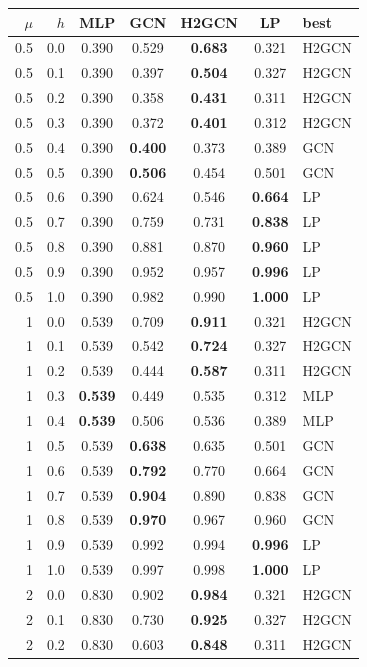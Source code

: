 \begin{tabular}{rrccccl}
\toprule
$\mu$ & $h$ & MLP & GCN & H2GCN & LP & best \\
\midrule
0.5 & 0.0 & 0.390 & 0.529 & \textbf{0.683} & 0.321 & H2GCN \\
0.5 & 0.1 & 0.390 & 0.397 & \textbf{0.504} & 0.327 & H2GCN \\
0.5 & 0.2 & 0.390 & 0.358 & \textbf{0.431} & 0.311 & H2GCN \\
0.5 & 0.3 & 0.390 & 0.372 & \textbf{0.401} & 0.312 & H2GCN \\
0.5 & 0.4 & 0.390 & \textbf{0.400} & 0.373 & 0.389 & GCN \\
0.5 & 0.5 & 0.390 & \textbf{0.506} & 0.454 & 0.501 & GCN \\
0.5 & 0.6 & 0.390 & 0.624 & 0.546 & \textbf{0.664} & LP \\
0.5 & 0.7 & 0.390 & 0.759 & 0.731 & \textbf{0.838} & LP \\
0.5 & 0.8 & 0.390 & 0.881 & 0.870 & \textbf{0.960} & LP \\
0.5 & 0.9 & 0.390 & 0.952 & 0.957 & \textbf{0.996} & LP \\
0.5 & 1.0 & 0.390 & 0.982 & 0.990 & \textbf{1.000} & LP \\
\midrule
1 & 0.0 & 0.539 & 0.709 & \textbf{0.911} & 0.321 & H2GCN \\
1 & 0.1 & 0.539 & 0.542 & \textbf{0.724} & 0.327 & H2GCN \\
1 & 0.2 & 0.539 & 0.444 & \textbf{0.587} & 0.311 & H2GCN \\
1 & 0.3 & \textbf{0.539} & 0.449 & 0.535 & 0.312 & MLP \\
1 & 0.4 & \textbf{0.539} & 0.506 & 0.536 & 0.389 & MLP \\
1 & 0.5 & 0.539 & \textbf{0.638} & 0.635 & 0.501 & GCN \\
1 & 0.6 & 0.539 & \textbf{0.792} & 0.770 & 0.664 & GCN \\
1 & 0.7 & 0.539 & \textbf{0.904} & 0.890 & 0.838 & GCN \\
1 & 0.8 & 0.539 & \textbf{0.970} & 0.967 & 0.960 & GCN \\
1 & 0.9 & 0.539 & 0.992 & 0.994 & \textbf{0.996} & LP \\
1 & 1.0 & 0.539 & 0.997 & 0.998 & \textbf{1.000} & LP \\
\midrule
2 & 0.0 & 0.830 & 0.902 & \textbf{0.984} & 0.321 & H2GCN \\
2 & 0.1 & 0.830 & 0.730 & \textbf{0.925} & 0.327 & H2GCN \\
2 & 0.2 & 0.830 & 0.603 & \textbf{0.848} & 0.311 & H2GCN \\

\end{tabular}
